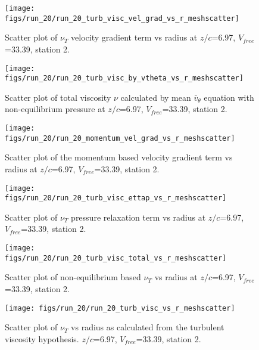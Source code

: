 \begin{figure}[H]
\centering
\texttt{[image: figs/run\_20/run\_20\_turb\_visc\_vel\_grad\_vs\_r\_meshscatter]}
\caption{Scatter plot of $\nu_T$ velocity gradient term vs radius at $z/c$=6.97, $V_{free}$=33.39, station 2.}
\end{figure}


\begin{figure}[H]
\centering
\texttt{[image: figs/run\_20/run\_20\_turb\_visc\_by\_vtheta\_vs\_r\_meshscatter]}
\caption{Scatter plot of total viscosity $\nu$ calculated by mean $\bar{v}_{\theta}$ equation with non-equilibrium pressure at $z/c$=6.97, $V_{free}$=33.39, station 2.}
\end{figure}


\begin{figure}[H]
\centering
\texttt{[image: figs/run\_20/run\_20\_momentum\_vel\_grad\_vs\_r\_meshscatter]}
\caption{Scatter plot of the momentum based velocity gradient term vs radius at $z/c$=6.97, $V_{free}$=33.39, station 2.}
\end{figure}


\begin{figure}[H]
\centering
\texttt{[image: figs/run\_20/run\_20\_turb\_visc\_ettap\_vs\_r\_meshscatter]}
\caption{Scatter plot of $\nu_T$ pressure relaxation term vs radius at $z/c$=6.97, $V_{free}$=33.39, station 2.}
\end{figure}


\begin{figure}[H]
\centering
\texttt{[image: figs/run\_20/run\_20\_turb\_visc\_total\_vs\_r\_meshscatter]}
\caption{Scatter plot of non-equilibrium based $\nu_T$ vs radius at $z/c$=6.97, $V_{free}$=33.39, station 2.}
\end{figure}


\begin{figure}[H]
\centering
\texttt{[image: figs/run\_20/run\_20\_turb\_visc\_vs\_r\_meshscatter]}
\caption{Scatter plot of $\nu_T$ vs radius as calculated from the turbulent viscosity hypothesis. $z/c$=6.97, $V_{free}$=33.39, station 2.}
\end{figure}


